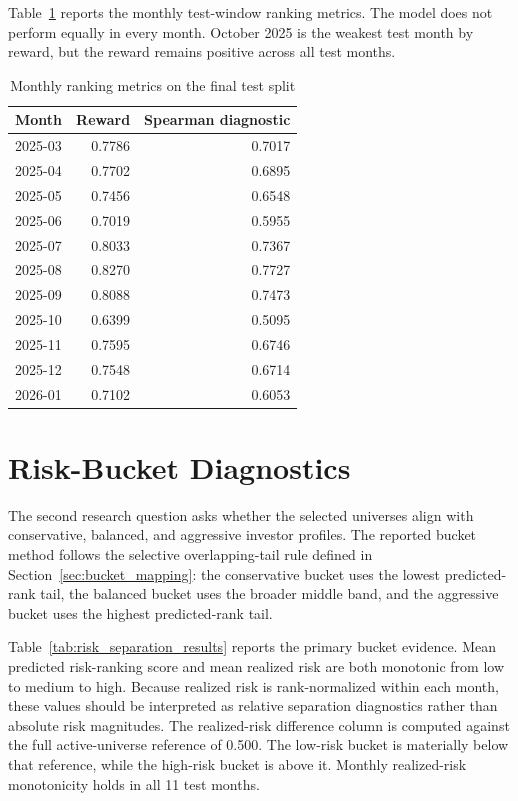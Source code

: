 Table~\ref{tab:test_monthly_metrics} reports the monthly test-window ranking metrics. The model does not perform equally in every month. October 2025 is the weakest test month by reward, but the reward remains positive across all test months.

\begin{table}[H]
\centering
\scriptsize
\caption{Monthly ranking metrics on the final test split}
\label{tab:test_monthly_metrics}
\begin{tabular}{lrr}
\toprule
Month & Reward & Spearman diagnostic \\
\midrule
2025-03 & 0.7786 & 0.7017 \\
2025-04 & 0.7702 & 0.6895 \\
2025-05 & 0.7456 & 0.6548 \\
2025-06 & 0.7019 & 0.5955 \\
2025-07 & 0.8033 & 0.7367 \\
2025-08 & 0.8270 & 0.7727 \\
2025-09 & 0.8088 & 0.7473 \\
2025-10 & 0.6399 & 0.5095 \\
2025-11 & 0.7595 & 0.6746 \\
2025-12 & 0.7548 & 0.6714 \\
2026-01 & 0.7102 & 0.6053 \\
\bottomrule
\end{tabular}
\end{table}

\section{Risk-Bucket Diagnostics}
\label{sec:risk_bucket_diagnostics}

The second research question asks whether the selected universes align with conservative, balanced, and aggressive investor profiles. The reported bucket method follows the selective overlapping-tail rule defined in Section~\ref{sec:bucket_mapping}: the conservative bucket uses the lowest predicted-rank tail, the balanced bucket uses the broader middle band, and the aggressive bucket uses the highest predicted-rank tail.

Table~\ref{tab:risk_separation_results} reports the primary bucket evidence. Mean predicted risk-ranking score and mean realized risk are both monotonic from low to medium to high. Because realized risk is rank-normalized within each month, these values should be interpreted as relative separation diagnostics rather than absolute risk magnitudes. The realized-risk difference column is computed against the full active-universe reference of 0.500. The low-risk bucket is materially below that reference, while the high-risk bucket is above it. Monthly realized-risk monotonicity holds in all 11 test months.

